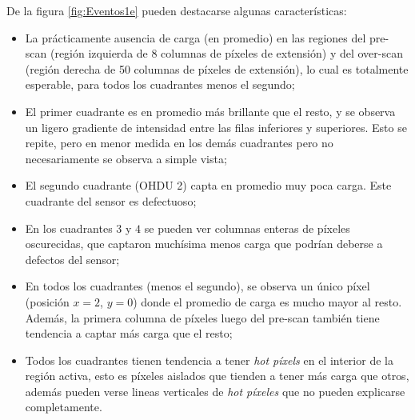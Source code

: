 \indent De la figura \ref{fig:Eventos1e} pueden destacarse algunas características:
\begin{itemize}
    \item La prácticamente ausencia de carga (en promedio) en las regiones del pre-scan (región izquierda de $8$ columnas de píxeles de extensión) y del over-scan (región derecha de 50 columnas de píxeles de extensión), lo cual es totalmente esperable, para todos los cuadrantes menos el segundo;
    \item El primer cuadrante es en promedio más brillante que el resto, y se observa un ligero gradiente de intensidad entre las filas inferiores y superiores. Esto se repite, pero en menor medida en los demás cuadrantes pero no necesariamente se observa a simple vista;
    \item El segundo cuadrante (OHDU 2) capta en promedio muy poca carga. Este cuadrante del sensor es defectuoso;
    \item En los cuadrantes $3$ y $4$ se pueden ver columnas enteras de píxeles oscurecidas, que captaron muchísima menos carga que podrían deberse a defectos del sensor;
    \item En todos los cuadrantes (menos el segundo), se observa un único píxel (posición $x = 2$, $y = 0$) donde el promedio de carga es mucho mayor al resto. Además, la primera columna de píxeles luego del pre-scan también tiene tendencia a captar más carga que el resto;
    \item Todos los cuadrantes tienen tendencia a tener \textit{hot píxels} en el interior de la región activa, esto es píxeles aislados que tienden a tener más carga que otros, además pueden verse lineas verticales de \textit{hot píxeles} que no pueden explicarse completamente.
\end{itemize}
